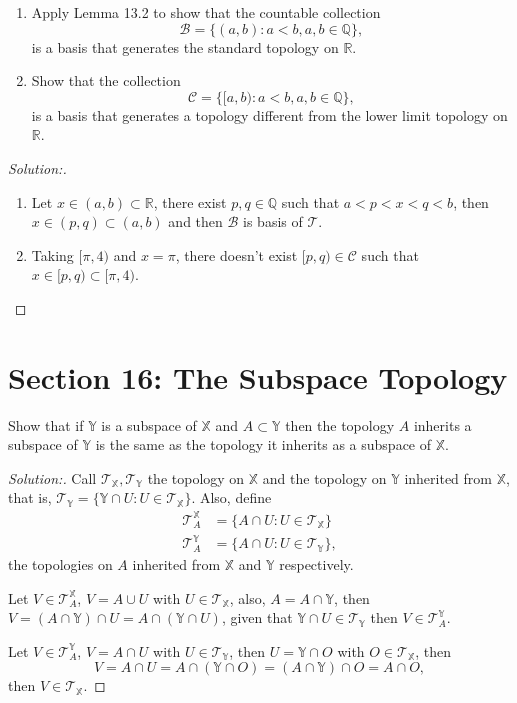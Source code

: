 \documentclass[a4paper,12pt, reqno]{article}
\theoremstyle{definition}
\newenvironment{exerr}[1]{
  \renewcommand\theexeralt{#1}
  \exeralt
}{\endexeralt}
\newenvironment{solution}{\begin{proof}[Solution:]}{\end{proof}}
\newcommand{\R}{\mathbb{R}}
\newcommand{\Q}{\mathbb{Q}}
\newcommand{\T}{\mathscr{T}}
\newcommand{\B}{\mathscr{B}}
\newcommand{\C}{\mathscr{C}}
\newcommand{\X}{\mathbb{X}}
\newcommand{\Y}{\mathbb{Y}}
\begin{document}
\begin{exerr}{8}\hfill
  \begin{enumerate}
    \item Apply Lemma 13.2 to show that the countable collection
          \begin{equation*}
            \B = \{ (a,b) : a<b,a,b\in\Q \},
          \end{equation*}
          is a basis that generates the standard topology on $\R$.
    \item Show that the collection
          \begin{equation*}
            \C = \{ [a,b) : a<b, a,b\in\Q \},
          \end{equation*}
          is a basis that generates a topology different from the lower limit topology on $\R$.
  \end{enumerate}
\end{exerr}
\begin{solution}\hfill
  \begin{enumerate}
    \item Let $x\in(a,b)\subset\R$, there exist $p,q\in\Q$ such that $a<p<x<q<b$, then $x\in(p,q)\subset (a,b)$ and then $\B$ is basis of $\T$.
    \item Taking $[\pi,4)$ and $x=\pi$, there doesn't exist $[p,q)\in\C$ such that $x\in[p,q)\subset[\pi,4)$.
  \end{enumerate}
\end{solution}

\section*{Section 16: The Subspace Topology}

\begin{exerr}{1}
  Show that if $\Y$ is a subspace of $\X$ and $A\subset\Y$ then the topology $A$ inherits a subspace of $\Y$ is the same as the topology it inherits as a subspace of $\X$.
\end{exerr}
\begin{solution}
  Call $\T_{\X}, \T_{\Y}$ the topology on $\X$ and the topology on $\Y$ inherited from $\X$, that is, $\T_{\Y}= \{ \Y\cap U : U\in\T_{\X} \}$. Also, define
  \begin{align*}
    \T_{A}^\X & = \{ A\cap U : U\in\T_{\X} \}  \\
    \T_{A}^\Y & = \{ A\cap U : U\in\T_{\Y} \},
  \end{align*}
  the topologies on $A$ inherited from $\X$ and $\Y$ respectively.

  Let $V\in\T_{A}^\X$, $V = A\cup U$ with $U\in\T_{\X}$, also, $A = A\cap\Y$, then $V = (A\cap \Y)\cap U = A\cap(\Y\cap U)$, given that $\Y\cap U\in\T_{\Y}$ then $V\in\T_{A}^\Y$.

  Let $V\in\T_{A}^\Y$, $V = A\cap U$ with $U\in\T_{\Y}$, then $U = \Y\cap O$ with $O\in\T_{\X}$, then
  \begin{equation*}
    V = A\cap U = A\cap (\Y\cap O) = (A\cap \Y)\cap O = A\cap O,
  \end{equation*}
  then $V\in\T_{\X}$.
\end{solution}
\end{document}
